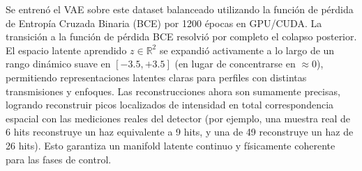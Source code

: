 \documentclass[12pt,letterpaper]{article}
\begin{document}
Se entrenó el VAE sobre este dataset balanceado utilizando la función de pérdida de Entropía Cruzada Binaria (BCE) por 1200 épocas en GPU/CUDA. La transición a la función de pérdida BCE resolvió por completo el colapso posterior. El espacio latente aprendido $z \in \mathbb{R}^2$ se expandió activamente a lo largo de un rango dinámico suave en $[-3.5, +3.5]$ (en lugar de concentrarse en $\approx 0$), permitiendo representaciones latentes claras para perfiles con distintas transmisiones y enfoques. Las reconstrucciones ahora son sumamente precisas, logrando reconstruir picos localizados de intensidad en total correspondencia espacial con las mediciones reales del detector (por ejemplo, una muestra real de 6 hits reconstruye un haz equivalente a 9 hits, y una de 49 reconstruye un haz de 26 hits). Esto garantiza un manifold latente continuo y físicamente coherente para las fases de control.
\end{document}
